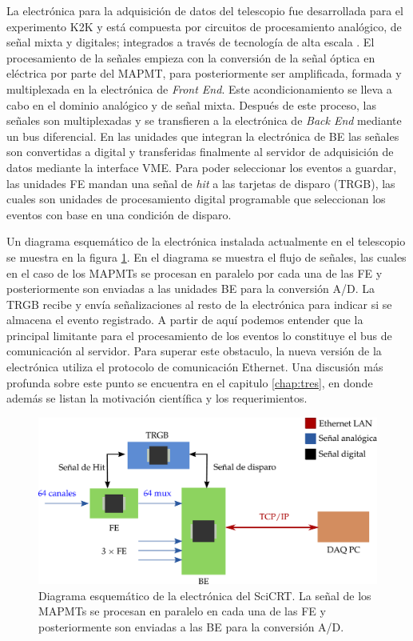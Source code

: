 La electrónica para la adquisición de datos del telescopio fue desarrollada para el experimento K2K y está compuesta por circuitos de procesamiento analógico, de señal mixta y digitales; integrados a través de tecnología de alta escala \cite{myoshi04}. El procesamiento de la señales empieza con la conversión de la señal óptica en eléctrica por parte del MAPMT, para posteriormente ser amplificada, formada y multiplexada en la electrónica de \emph{Front End}. Este acondicionamiento se lleva a cabo en el dominio analógico y de señal mixta. Después de este proceso, las señales son multiplexadas y se transfieren a la electrónica de \emph{Back End} mediante un bus diferencial. En las unidades que integran la electrónica de BE las señales son convertidas a digital y transferidas finalmente al servidor de adquisición de datos mediante la interface VME. Para poder seleccionar los eventos a guardar, las unidades FE mandan una señal de \emph{hit} a las tarjetas de disparo (TRGB), las cuales son unidades de procesamiento digital programable que seleccionan los eventos con base en una condición de disparo.

Un diagrama esquemático de la electrónica instalada actualmente en el telescopio se muestra en la figura \ref{fig:scibar-electronics}. En el diagrama se muestra el flujo de señales, las cuales en el caso de los MAPMTs se procesan en paralelo por cada una de las FE y posteriormente son enviadas a las unidades BE para la conversión A/D. La TRGB recibe y envía señalizaciones al resto de la electrónica para indicar si se almacena el evento registrado. A partir de aquí podemos entender que la principal limitante  para el procesamiento de los eventos lo constituye el bus de comunicación al servidor. Para superar este obstaculo, la nueva versión de la electrónica utiliza el protocolo de comunicación Ethernet. Una discusión más profunda sobre este punto se encuentra en el capitulo \ref{chap:tres}, en donde además se listan la motivación científica y los requerimientos.

\begin{figure}
        \centering
        \includegraphics[width=\textwidth]{scicrt-electronics.pdf}
        \caption{Diagrama esquemático de la electrónica del SciCRT. La señal de los MAPMTs se procesan en paralelo en cada una de las FE y posteriormente son enviadas a las BE para la conversión A/D.}
        \label{fig:scibar-electronics}
\end{figure}

